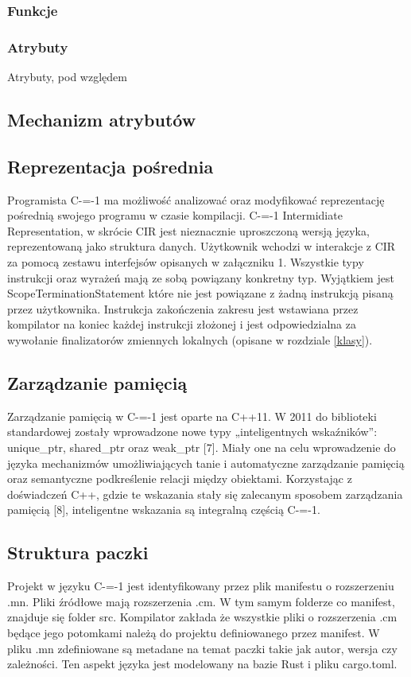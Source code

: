 \subsubsection{Funkcje}
\subsubsection{Atrybuty}

Atrybuty, pod względem 
\subsection{Mechanizm atrybutów}
\subsection{Reprezentacja pośrednia}\label{reprezentacja_posrednia}
Programista C-=-1 ma możliwość analizować oraz modyfikować reprezentację pośrednią swojego programu w czasie kompilacji. C-=-1 Intermidiate Representation, w skrócie CIR jest nieznacznie uproszczoną wersją języka, reprezentowaną jako struktura danych.
Użytkownik wchodzi w interakcje z CIR za pomocą zestawu interfejsów opisanych w załączniku 1. Wszystkie typy instrukcji oraz wyrażeń mają ze sobą powiązany konkretny typ. Wyjątkiem jest ScopeTerminationStatement które nie jest powiązane z żadną instrukcją pisaną przez użytkownika. Instrukcja zakończenia zakresu jest wstawiana przez kompilator na koniec każdej instrukcji złożonej i jest odpowiedzialna za wywołanie finalizatorów zmiennych lokalnych (opisane w rozdziale \ref{klasy}).
\subsection{Zarządzanie pamięcią}
Zarządzanie pamięcią w C-=-1 jest oparte na C++11. W 2011 do biblioteki standardowej zostały wprowadzone nowe typy „inteligentnych wskaźników”: unique\_ptr, shared\_ptr oraz weak\_ptr [7]. Miały one na celu wprowadzenie do języka mechanizmów umożliwiających tanie i automatyczne zarządzanie pamięcią oraz semantyczne podkreślenie relacji między obiektami.
Korzystając z doświadczeń C++, gdzie te wskazania stały się zalecanym sposobem zarządzania pamięcią [8], inteligentne wskazania są integralną częścią C-=-1.
\subsection{Struktura paczki}\label{struktura_paczki}
Projekt w języku C-=-1 jest identyfikowany przez plik manifestu o rozszerzeniu .mn. Pliki źródłowe mają rozszerzenia .cm. W tym samym folderze co manifest, znajduje się folder src. Kompilator zakłada że wszystkie pliki o rozszerzenia .cm będące jego potomkami należą do projektu definiowanego przez manifest.
W pliku .mn zdefiniowane są metadane na temat paczki takie jak autor, wersja czy zależności. Ten aspekt języka jest modelowany na bazie Rust i pliku cargo.toml.
